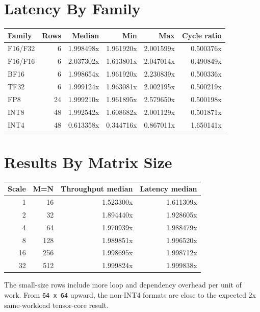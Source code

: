 \documentclass[10pt]{article}
\begin{document}
\section{Latency By Family}

\begin{center}
\small
\begin{tabular}{lrrrrr}
\toprule
Family & Rows & Median & Min & Max & Cycle ratio \\
\midrule
F16/F32 & 6 & 1.998498x & 1.961920x & 2.001599x & 0.500376x \\
F16/F16 & 6 & 2.037302x & 1.613801x & 2.047014x & 0.490849x \\
BF16 & 6 & 1.998654x & 1.961920x & 2.230839x & 0.500336x \\
TF32 & 6 & 1.999124x & 1.963081x & 2.002195x & 0.500219x \\
FP8 & 24 & 1.999210x & 1.961895x & 2.579650x & 0.500198x \\
INT8 & 48 & 1.992542x & 1.608682x & 2.001129x & 0.501871x \\
INT4 & 48 & 0.613358x & 0.344716x & 0.867011x & 1.650141x \\
\bottomrule
\end{tabular}
\end{center}

\section{Results By Matrix Size}

\begin{center}
\small
\begin{tabular}{rrrr}
\toprule
Scale & M=N & Throughput median & Latency median \\
\midrule
1 & 16 & 1.523300x & 1.611309x \\
2 & 32 & 1.894440x & 1.928605x \\
4 & 64 & 1.970939x & 1.988479x \\
8 & 128 & 1.989851x & 1.996520x \\
16 & 256 & 1.998695x & 1.998712x \\
32 & 512 & 1.999824x & 1.999838x \\
\bottomrule
\end{tabular}
\end{center}

The small-size rows include more loop and dependency overhead per unit of work.
From \texttt{64 x 64} upward, the non-INT4 formats are close to the expected 2x
same-workload tensor-core result.
\end{document}
